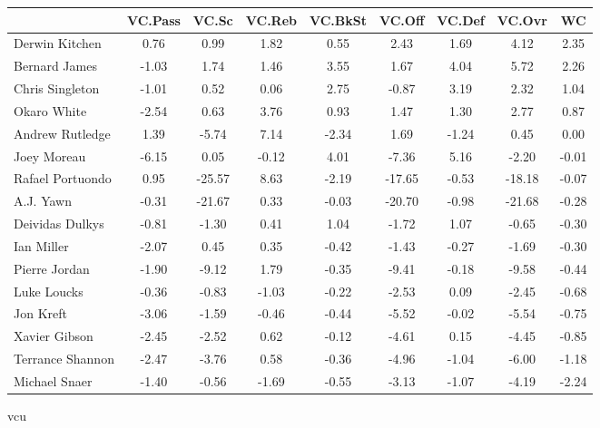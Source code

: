 \documentclass[10pt,letterpaper]{article}
\begin{document}
\begin{table}[ht]
\begin{center}
\begin{tabular}{lcccccccc}
  \hline
 & VC.Pass & VC.Sc & VC.Reb & VC.BkSt & VC.Off & VC.Def & VC.Ovr & WC \\ 
  \hline
Derwin Kitchen & 0.76 & 0.99 & 1.82 & 0.55 & 2.43 & 1.69 & 4.12 & 2.35 \\ 
  Bernard James & -1.03 & 1.74 & 1.46 & 3.55 & 1.67 & 4.04 & 5.72 & 2.26 \\ 
  Chris Singleton & -1.01 & 0.52 & 0.06 & 2.75 & -0.87 & 3.19 & 2.32 & 1.04 \\ 
  Okaro White & -2.54 & 0.63 & 3.76 & 0.93 & 1.47 & 1.30 & 2.77 & 0.87 \\ 
  Andrew Rutledge & 1.39 & -5.74 & 7.14 & -2.34 & 1.69 & -1.24 & 0.45 & 0.00 \\ 
  Joey Moreau & -6.15 & 0.05 & -0.12 & 4.01 & -7.36 & 5.16 & -2.20 & -0.01 \\ 
  Rafael Portuondo & 0.95 & -25.57 & 8.63 & -2.19 & -17.65 & -0.53 & -18.18 & -0.07 \\ 
  A.J. Yawn & -0.31 & -21.67 & 0.33 & -0.03 & -20.70 & -0.98 & -21.68 & -0.28 \\ 
  Deividas Dulkys & -0.81 & -1.30 & 0.41 & 1.04 & -1.72 & 1.07 & -0.65 & -0.30 \\ 
  Ian Miller & -2.07 & 0.45 & 0.35 & -0.42 & -1.43 & -0.27 & -1.69 & -0.30 \\ 
  Pierre Jordan & -1.90 & -9.12 & 1.79 & -0.35 & -9.41 & -0.18 & -9.58 & -0.44 \\ 
  Luke Loucks & -0.36 & -0.83 & -1.03 & -0.22 & -2.53 & 0.09 & -2.45 & -0.68 \\ 
  Jon Kreft & -3.06 & -1.59 & -0.46 & -0.44 & -5.52 & -0.02 & -5.54 & -0.75 \\ 
  Xavier Gibson & -2.45 & -2.52 & 0.62 & -0.12 & -4.61 & 0.15 & -4.45 & -0.85 \\ 
  Terrance Shannon & -2.47 & -3.76 & 0.58 & -0.36 & -4.96 & -1.04 & -6.00 & -1.18 \\ 
  Michael Snaer & -1.40 & -0.56 & -1.69 & -0.55 & -3.13 & -1.07 & -4.19 & -2.24 \\ 
   \hline
\end{tabular}
\end{center}
\end{table}
\newpage
\begin{center}
vcu 
\end{center}
\end{document}
